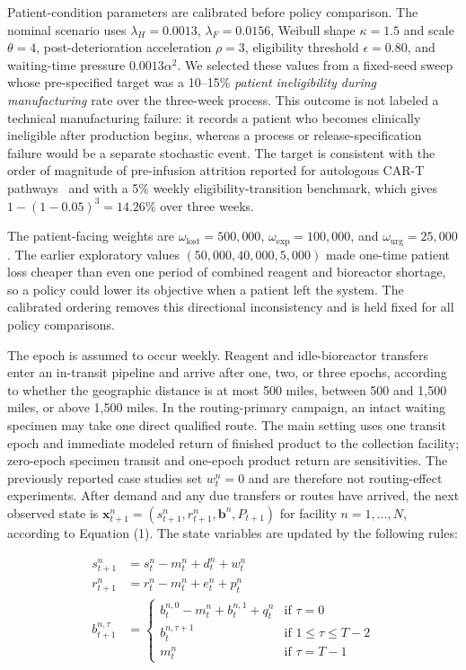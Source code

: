 \documentclass[preprint,review,12pt]{elsarticle}
\begin{document}
Patient-condition parameters are calibrated before policy comparison. The
nominal scenario uses $\lambda_H=0.0013$, $\lambda_F=0.0156$, Weibull shape
$\kappa=1.5$ and scale $\theta=4$, post-deterioration acceleration $\rho=3$,
eligibility threshold $\epsilon=0.80$, and waiting-time pressure
$0.0013\alpha^2$. We selected these values from a fixed-seed sweep whose
pre-specified target was a 10--15\% \emph{patient ineligibility during
manufacturing} rate over the three-week process. This outcome is not labeled a
technical manufacturing failure: it records a patient who becomes clinically
ineligible after production begins, whereas a process or release-specification
failure would be a separate stochastic event. The target is consistent with the
order of magnitude of pre-infusion attrition reported for autologous CAR-T
pathways~\cite{AyalaCeja2024CARTManufacturing} and with a 5\% weekly
eligibility-transition benchmark, which gives
$1-(1-0.05)^3=14.26\%$ over three weeks.

The patient-facing weights are
$\omega_{\mathrm{lost}}=500{,}000$,
$\omega_{\mathrm{exp}}=100{,}000$, and
$\omega_{\mathrm{urg}}=25{,}000$. The earlier exploratory values
$(50{,}000,40{,}000,5{,}000)$ made one-time patient loss cheaper than even one
period of combined reagent and bioreactor shortage, so a policy could lower its
objective when a patient left the system. The calibrated ordering removes this
directional inconsistency and is held fixed for all policy comparisons.

The epoch is assumed to occur weekly. Reagent and idle-bioreactor transfers
enter an in-transit pipeline and arrive after one, two, or three epochs,
according to whether the geographic distance is at most 500 miles, between 500
and 1,500 miles, or above 1,500 miles. In the routing-primary campaign, an
intact waiting specimen may take one direct qualified route. The main setting
uses one transit epoch and immediate modeled return of finished product to the
collection facility; zero-epoch specimen transit and one-epoch product return
are sensitivities. The previously reported case studies set $w_t^n=0$ and are
therefore not routing-effect experiments. After demand and any due transfers
or routes have arrived, the next observed state is
$\mathbf{x}_{t+1}^{n}=\left(s_{t+1}^{n}, r_{t+1}^{n}, \mathbf{b}^{n},
P_{t+1}\right)$ for facility $n=1, \ldots, N$, according to Equation (1). The
state variables are updated by the following rules:

\begin{align*}
s_{t+1}^{n}&=s_{t}^{n}-m_{t}^{n}+d_{t}^{n}+w_{t}^{n} \\
r_{t+1}^{n}&=r_{t}^{n}-m_{t}^{n}+e_{t}^{n}+p_{t}^{n} \\
b_{t+1}^{n, \tau}&= \begin{cases}
b_{t}^{n, 0}-m_{t}^{n}+b_{t}^{n, 1}+q_{t}^{n} & \text{if } \tau=0 \\
b_{t}^{n, \tau+1} & \text{if } 1 \leq \tau \leq T-2 \\
m_{t}^{n} & \text{if } \tau=T-1
\end{cases}
\end{align*}
\end{document}
